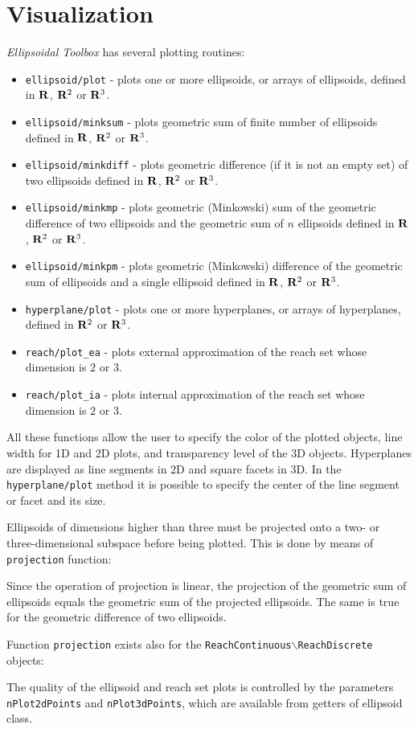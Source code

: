 \section{Visualization}
{\it Ellipsoidal Toolbox} has several plotting routines:
\begin{itemize}
\item {\tt ellipsoid/plot} - plots one or more ellipsoids, or arrays of
ellipsoids, defined in ${\bf R}$, ${\bf R}^2$ or ${\bf R}^3$.
\item {\tt ellipsoid/minksum} - plots geometric sum of finite number of
ellipsoids defined in ${\bf R}$, ${\bf R}^2$ or ${\bf R}^3$.
\item {\tt ellipsoid/minkdiff} - plots geometric difference
(if it is not an empty set) of two ellipsoids defined in
${\bf R}$, ${\bf R}^2$ or ${\bf R}^3$.
\item {\tt ellipsoid/minkmp} - plots geometric (Minkowski) sum
of the geometric difference of two ellipsoids and the geometric sum of $n$
ellipsoids defined in ${\bf R}$, ${\bf R}^2$ or ${\bf R}^3$.
\item {\tt ellipsoid/minkpm} - plots geometric (Minkowski) difference of the
geometric sum of ellipsoids and a single ellipsoid defined in
${\bf R}$, ${\bf R}^2$ or ${\bf R}^3$.
\item {\tt hyperplane/plot} - plots one or more hyperplanes, or arrays of
hyperplanes, defined in ${\bf R}^2$ or ${\bf R}^3$.
\item {\tt reach/plot\_ea} - plots external approximation of the reach set
whose dimension is $2$ or $3$.
\item {\tt reach/plot\_ia} - plots internal approximation of the reach set
whose dimension is $2$ or $3$.
\end{itemize}
All these functions allow the user to specify the color of the plotted objects,
line width for 1D and 2D plots, and transparency level of the 3D objects.
Hyperplanes are displayed as line segments in 2D and square facets in 3D.
In the {\tt hyperplane/plot} method it is possible to specify the center
of the line segment or facet and its size.

Ellipsoids of dimensions higher than three must be
projected onto a two- or three-dimensional subspace before being plotted.
This is done by means of {\tt projection} function:

Since the operation of projection is linear, the projection of the geometric
sum of ellipsoids equals the geometric sum of the projected ellipsoids.
The same is true for the geometric difference of two ellipsoids.

Function {\tt projection} exists also for the {\tt ReachContinuous$\backslash$ReachDiscrete} objects:

The quality of the ellipsoid and reach set plots is controlled by the
parameters {\tt nPlot2dPoints} and {\tt nPlot3dPoints}, which are available
from getters of ellipsoid class.

